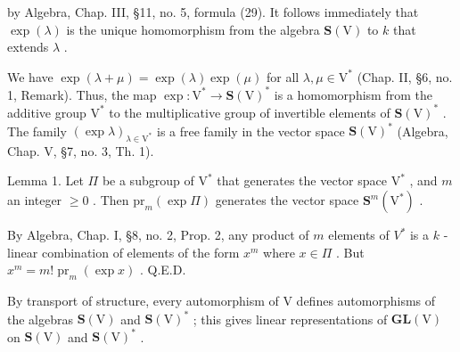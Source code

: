 by Algebra, Chap. III, §11, no. 5, formula (29). It follows immediately that \(\exp(\lambda)\) is the unique homomorphism from the algebra \(\mathbf{S}(\mathrm{V})\) to \(k\) that extends \(\lambda\) .

We have \(\exp (\lambda +\mu) = \exp (\lambda)\exp (\mu)\) for all \(\lambda ,\mu \in \mathrm{V}^{*}\) (Chap. II, §6, no. 1, Remark). Thus, the map \(\exp :\mathrm{V}^{*}\to \mathbf{S}(\mathrm{V})^{*}\) is a homomorphism from the additive group \(\mathrm{V}^*\) to the multiplicative group of invertible elements of \(\mathbf{S}(\mathrm{V})^{*}\) . The family \((\exp \lambda)_{\lambda \in \mathrm{V}^{*}}\) is a free family in the vector space \(\mathbf{S}(\mathrm{V})^{*}\) (Algebra, Chap. V, §7, no. 3, Th. 1).

Lemma 1. Let \(\Pi\) be a subgroup of \(\mathrm{V}^*\) that generates the vector space \(\mathrm{V}^*\) , and \(m\) an integer \(\geq 0\) . Then \(\mathrm{pr}_m(\exp \Pi)\) generates the vector space \(\mathbf{S}^m (\mathrm{V}^*)\) .

By Algebra, Chap. I, §8, no. 2, Prop. 2, any product of \(m\) elements of \(V^{*}\) is a \(k\) -linear combination of elements of the form \(x^{m}\) where \(x \in \Pi\) . But \(x^{m} = m! \operatorname{pr}_{m}(\exp x)\) . Q.E.D.

By transport of structure, every automorphism of V defines automorphisms of the algebras \(\mathbf{S}(\mathrm{V})\) and \(\mathbf{S}(\mathrm{V})^{*}\) ; this gives linear representations of \(\mathbf{GL}(\mathrm{V})\) on \(\mathbf{S}(\mathrm{V})\) and \(\mathbf{S}(\mathrm{V})^{*}\) .

